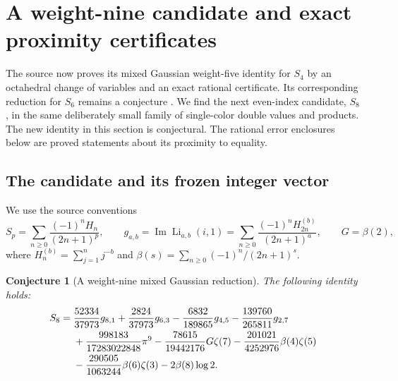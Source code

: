 \documentclass[11pt,letterpaper]{article}
\numberwithin{equation}{section}
\theoremstyle{plain}
\newtheorem{conjecture}[theorem]{Conjecture}
\theoremstyle{definition}
\theoremstyle{remark}
\DeclareMathOperator{\Li}{Li}
\begin{document}


\section{A weight-nine candidate and exact proximity certificates}
\label{cont26:sec:s8}

The source now proves its mixed Gaussian weight-five identity for $S_4$
by an octahedral change of variables and an exact rational certificate.
Its corresponding reduction for $S_6$ remains a conjecture
\cite{ProveIt}. We find the next even-index candidate, $S_8$, in the
same deliberately small family of single-color double values and products.
The new identity in this section is conjectural. The rational error
enclosures below are proved statements about its proximity to equality.

\subsection{The candidate and its frozen integer vector}
We use the source conventions
\[
 S_p=\sum_{n\geq0}\frac{(-1)^nH_n}{(2n+1)^p},\qquad
 g_{a,b}=\operatorname{Im}\Li_{a,b}(i,1)
 =\sum_{n\geq0}\frac{(-1)^nH_{2n}^{(b)}}{(2n+1)^a},
 \qquad G=\beta(2),
\]
where $H_n^{(b)}=\sum_{j=1}^n j^{-b}$ and
$\beta(s)=\sum_{n\geq0}(-1)^n/(2n+1)^s$.

\begin{conjecture}[A weight-nine mixed Gaussian reduction]
\label{cont26:conj:s8}
The following identity holds:
\begin{align}
 S_8={}&\frac{52334}{37973}g_{8,1}
       +\frac{2824}{37973}g_{6,3}
       -\frac{6832}{189865}g_{4,5}
       -\frac{139760}{265811}g_{2,7}\notag\\
      &+\frac{998183}{17283022848}\pi^9
       -\frac{78615}{19442176}G\zeta(7)
       -\frac{201021}{4252976}\beta(4)\zeta(5)\notag\\
      &-\frac{290505}{1063244}\beta(6)\zeta(3)
       -2\beta(8)\log2.
 \label{cont26:eq:s8-candidate}
\end{align}
\end{conjecture}
\end{document}
